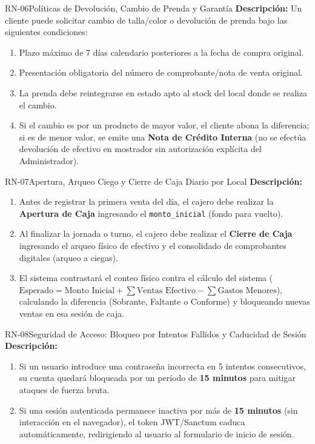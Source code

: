 \begin{rnbox}{RN-06}{Políticas de Devolución, Cambio de Prenda y Garantía}
\textbf{Descripción:} Un cliente puede solicitar cambio de talla/color o devolución de prenda bajo las siguientes condiciones:
\begin{enumerate}[leftmargin=*,noitemsep]
    \item Plazo máximo de 7 días calendario posteriores a la fecha de compra original.
    \item Presentación obligatoria del número de comprobante/nota de venta original.
    \item La prenda debe reintegrarse en estado apto al stock del local donde se realiza el cambio.
    \item Si el cambio es por un producto de mayor valor, el cliente abona la diferencia; si es de menor valor, se emite una \textbf{Nota de Crédito Interna} (no se efectúa devolución de efectivo en mostrador sin autorización explícita del Administrador).
\end{enumerate}
\end{rnbox}

\begin{rnbox}{RN-07}{Apertura, Arqueo Ciego y Cierre de Caja Diario por Local}
\textbf{Descripción:} 
\begin{enumerate}[leftmargin=*,noitemsep]
    \item Antes de registrar la primera venta del día, el cajero debe realizar la \textbf{Apertura de Caja} ingresando el \texttt{monto\_inicial} (fondo para vuelto).
    \item Al finalizar la jornada o turno, el cajero debe realizar el \textbf{Cierre de Caja} ingresando el arqueo físico de efectivo y el consolidado de comprobantes digitales (arqueo a ciegas).
    \item El sistema contrastará el conteo físico contra el cálculo del sistema ($\text{Esperado} = \text{Monto Inicial} + \sum \text{Ventas Efectivo} - \sum \text{Gastos Menores}$), calculando la diferencia (Sobrante, Faltante o Conforme) y bloqueando nuevas ventas en esa sesión de caja.
\end{enumerate}
\end{rnbox}

\begin{rnbox}{RN-08}{Seguridad de Acceso: Bloqueo por Intentos Fallidos y Caducidad de Sesión}
\textbf{Descripción:} 
\begin{enumerate}[leftmargin=*,noitemsep]
    \item Si un usuario introduce una contraseña incorrecta en 5 intentos consecutivos, su cuenta quedará bloqueada por un período de \textbf{15 minutos} para mitigar ataques de fuerza bruta.
    \item Si una sesión autenticada permanece inactiva por más de \textbf{15 minutos} (sin interacción en el navegador), el token JWT/Sanctum caduca automáticamente, redirigiendo al usuario al formulario de inicio de sesión.
\end{enumerate}
\end{rnbox}

